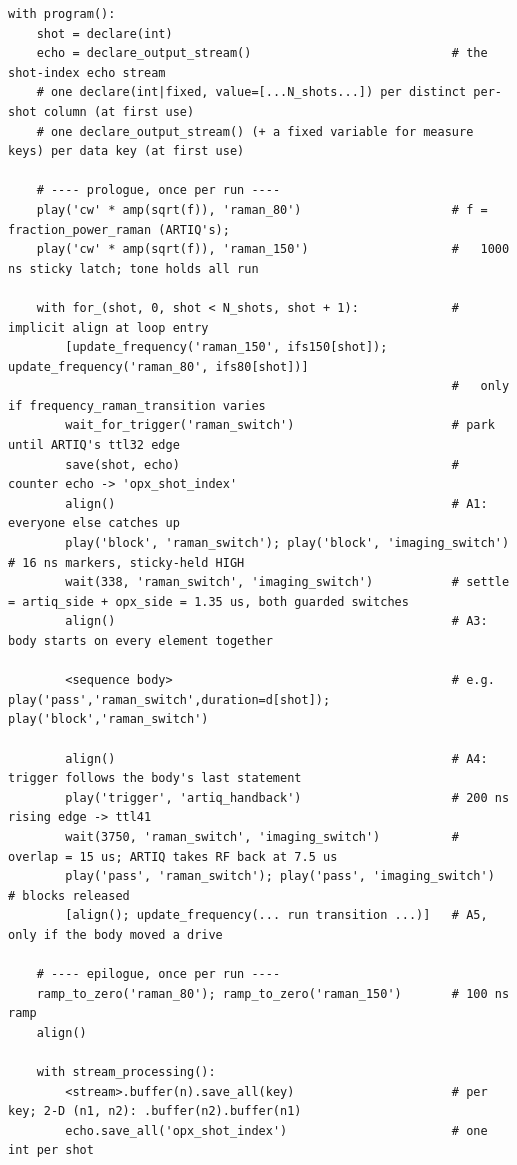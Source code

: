 \begin{lstlisting}[style=qua]
with program():
    shot = declare(int)
    echo = declare_output_stream()                            # the shot-index echo stream
    # one declare(int|fixed, value=[...N_shots...]) per distinct per-shot column (at first use)
    # one declare_output_stream() (+ a fixed variable for measure keys) per data key (at first use)

    # ---- prologue, once per run ----
    play('cw' * amp(sqrt(f)), 'raman_80')                     # f = fraction_power_raman (ARTIQ's);
    play('cw' * amp(sqrt(f)), 'raman_150')                    #   1000 ns sticky latch; tone holds all run

    with for_(shot, 0, shot < N_shots, shot + 1):             # implicit align at loop entry
        [update_frequency('raman_150', ifs150[shot]); update_frequency('raman_80', ifs80[shot])]
                                                              #   only if frequency_raman_transition varies
        wait_for_trigger('raman_switch')                      # park until ARTIQ's ttl32 edge
        save(shot, echo)                                      # counter echo -> 'opx_shot_index'
        align()                                               # A1: everyone else catches up
        play('block', 'raman_switch'); play('block', 'imaging_switch')   # 16 ns markers, sticky-held HIGH
        wait(338, 'raman_switch', 'imaging_switch')           # settle = artiq_side + opx_side = 1.35 us, both guarded switches
        align()                                               # A3: body starts on every element together

        <sequence body>                                       # e.g. play('pass','raman_switch',duration=d[shot]); play('block','raman_switch')

        align()                                               # A4: trigger follows the body's last statement
        play('trigger', 'artiq_handback')                     # 200 ns rising edge -> ttl41
        wait(3750, 'raman_switch', 'imaging_switch')          # overlap = 15 us; ARTIQ takes RF back at 7.5 us
        play('pass', 'raman_switch'); play('pass', 'imaging_switch')     # blocks released
        [align(); update_frequency(... run transition ...)]   # A5, only if the body moved a drive

    # ---- epilogue, once per run ----
    ramp_to_zero('raman_80'); ramp_to_zero('raman_150')       # 100 ns ramp
    align()

    with stream_processing():
        <stream>.buffer(n).save_all(key)                      # per key; 2-D (n1, n2): .buffer(n2).buffer(n1)
        echo.save_all('opx_shot_index')                       # one int per shot
\end{lstlisting}

